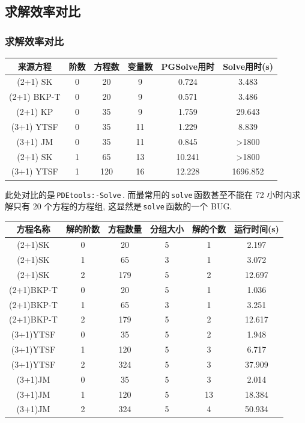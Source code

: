 \documentclass[handout]{beamer}
\newcommand{\cd}[1]{\,\texttt{#1}\,}
\newcommand{\red}[1]{{\color{red}#1}}
\begin{document}
\subsection{求解效率对比}
\begin{frame}
\frametitle{求解效率对比}
\begin{adjustbox}{max width=\textwidth}
\centering
\renewcommand{\arraystretch}{1.3}
\begin{tabular}{cccccc}
\hline
来源方程 & 阶数 & 方程数 & 变量数 & PGSolve用时 & Solve用时(s) \\
\hline
(2+1) SK & 0 & 20 & 9 & 0.724 & 3.483 \\
(2+1) BKP-T & 0 & 20 & 9 & 0.571 & 3.486 \\
(2+1) KP & 0 & 35 & 9 & 1.759 & 29.643 \\
(3+1) YTSF & 0 & 35 & 11 & 1.229 & 8.839 \\
(3+1) JM & 0 & 35 & 11 & 0.845 & >1800 \\
(2+1) SK & 1 & 65 & 13 & 10.241 & >1800 \\
(3+1) YTSF & 1 & 120 & 16 & \red{12.228} & \red{1696.852} \\
\hline
\end{tabular}
\end{adjustbox}

\vspace{1em}

此处对比的是\cd{PDEtools:-Solve}. 而最常用的\cd{solve}函数甚至不能在 72 小时内求解只有 20 个方程的方程组, 这显然是\cd{solve}函数的一个 BUG.

\end{frame}

\begin{frame}

\begin{adjustbox}{max width=\textwidth}
\renewcommand{\arraystretch}{1.3}
\begin{tabular}{cccccc}
\hline
方程名称    & 解的阶数 & 方程数量 & 分组大小 & 解的个数 & 运行时间(s) \\ 
\hline 
(2+1)SK & 0 & 20 & 5 & 1 & 2.197 \\
(2+1)SK & 1 & 65 & 3 & 1 & 3.072 \\
(2+1)SK & 2 & 179 & 5 & 2 & 12.697 \\
(2+1)BKP-T & 0 & 20 & 5 & 1 & 1.036 \\
(2+1)BKP-T & 1 & 65 & 3 & 1 & 3.251 \\
(2+1)BKP-T & 2 & 179 & 5 & 2 & 12.617 \\
(3+1)YTSF & 0 & 35 & 5 & 2 & 1.948 \\
(3+1)YTSF & 1 & 120 & 5 & 3 & 6.717 \\
(3+1)YTSF & 2 & \red{324} & 5 & 3 & \red{37.909} \\
(3+1)JM & 0 & 35 & 5 & 3 & 2.014 \\
(3+1)JM & 1 & 120 & 5 & 13 & 18.384 \\
(3+1)JM & 2 & \red{324} & 5 & 4 & \red{50.934} \\
\hline 
\end{tabular}
\end{adjustbox}

\end{frame}
\end{document}
